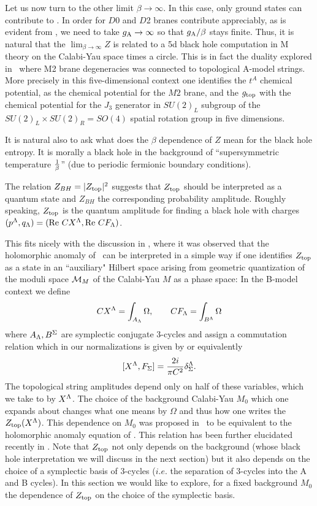 Let us now turn to the other limit $\beta \rightarrow \infty$.
In this case, only ground states can contribute to \dpar .
In order for $D$0 and $D$2 branes contribute appreciably,
as is evident from \dpar , we need to take $g_{\rm A}
\rightarrow \infty$ so that $g_{\rm A}/\beta$ stays finite.
Thus, it is natural that the $\lim_{\beta \rightarrow\infty}Z$
is related to a 5d black
hole computation in M theory on the Calabi-Yau space times
a circle.   This
is in fact the duality explored in \gova\
where M2 brane degeneracies was connected to topological A-model
strings.  More precisely in this five-dimensional context one identifies
the $t^A$ chemical potential, as the chemical potential
for the $M2$ brane, and the $g_{\rm top}$ with the chemical potential
for the $J_3$ generator in $SU(2)_L$ subgroup of the $SU(2)_L\times
SU(2)_R=SO(4)$ spatial rotation group in five dimensions.



It is natural also to ask what does the $\beta $ dependence of $Z$
mean for the black hole entropy.  It is morally a
black hole in the background of ``supersymmetric temperature $1\over \beta$''
(due to periodic fermionic boundary conditions).


 The relation $Z_{BH}=|Z_{\rm top}|^2$ suggests that
 $Z_{\rm top}$ should be interpreted as a quantum state
 and
$Z_{BH}$ the corresponding probability amplitude. Roughly
speaking, $Z_{\rm top}$ is the quantum amplitude for finding a black
hole with charges $(p^{\Lambda},q_{\Lambda})=({\rm Re}\ CX^{\Lambda}, {\rm Re}\ CF_{\Lambda})$.

This fits nicely with the discussion in \wittenqb , where it was
observed that the holomorphic anomaly of \bcov\ can be
interpreted in a simple way if one identifies
$Z_{\rm top}$ as a state in an ``auxiliary"
Hilbert space arising from geometric quantization of the moduli
space ${\cal M}_M$ of the Calabi-Yau $M$ as a phase space:
In the B-model context we define
%
$$CX^{\Lambda}=\int_{A_{\Lambda}} \Omega ,\qquad C F_{\Lambda}=\int_{B^{\Lambda}} \Omega$$
%
where $A_{\Lambda}, B^\Sigma $  are symplectic conjugate 3-cycles and
assign a commutation relation which in our normalizations is given
by
%
\eqn{}
%
or equivalently
%
$$ [X^{\Lambda}, F_\Sigma]={2i \over \pi C^2} \delta^{\Lambda}_\Sigma. $$
%
The topological string amplitudes depend only on half of these
variables, which we take to by $X^{\Lambda}$. The choice of the
background Calabi-Yau $M_0$ which one expands about changes what
one means by $\Omega$ and thus how one writes the $Z_{\rm top}(X^{\Lambda})$.
This dependence on $M_0$ was proposed in \wittenqb\ to be
equivalent to the holomorphic anomaly equation of \bcov .  This
relation has been further elucidated recently in \mvv .  Note that
$Z_{\rm top}$ not only depends on the background (whose black hole
interpretation we will discuss in the next section) but it also
depends on the choice of a symplectic basis of 3-cycles ($i.e.$ 
the separation of 3-cycles into the A and B cycles).  In this
section we would like to explore, for a fixed background $M_0$ the
dependence of $Z_{\rm top}$ on the choice of the symplectic basis.

